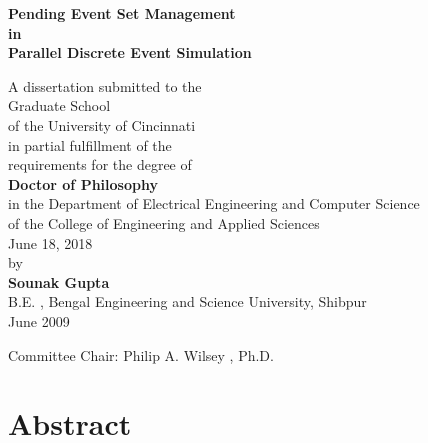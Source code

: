 \documentclass[11pt]{book}
\begin{document}
\raggedbottom

\thispagestyle{empty}

\doublespacing

\begin{center}
\textbf{
\LARGE  Pending Event Set Management\\
        in\\
        Parallel Discrete Event Simulation\\
}

\vspace*{0.4in}

{\large A dissertation submitted to the\\[0.20in]
        Graduate School\\
        of the University of Cincinnati\\[0.20in]
        in partial fulfillment of the\\
        requirements for the degree of\\[0.20in]
        \textbf{\Large Doctor of Philosophy}\\[0.20in]
        in the Department of Electrical Engineering and Computer Science\\
        of the College of Engineering and Applied Sciences\\[0.20in]
        June 18, 2018\\[0.20in]
        by\\[0.20in]
        \textbf{Sounak Gupta}\\
        B.E. , Bengal Engineering and Science University, Shibpur\\
        June 2009\\
}

\vspace{0.4in}
{\large Committee Chair:  Philip A. Wilsey , Ph.D.}

\end{center}

\clearpage

\setcounter{page}{1}
\clearpage

\newpage
\chapter*{Abstract}\label{chapter:abstract}
\end{document}
